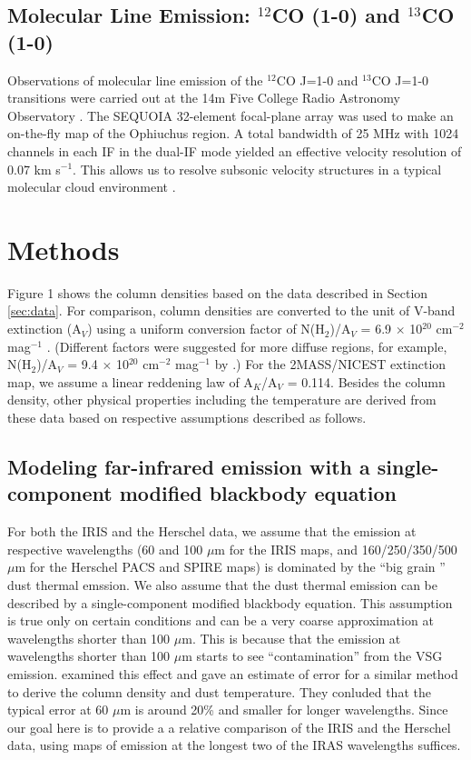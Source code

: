 \documentclass{emulateapj}
\begin{document}
\subsection{Molecular Line Emission: $^{12}$CO (1-0) and $^{13}$CO (1-0)}
Observations of molecular line emission of the $^{12}$CO J=1-0 and $^{13}$CO J=1-0 transitions were carried out at the 14m Five College Radio Astronomy Observatory \citep[FCRAO;]{Ridge_2006}. The SEQUOIA 32-element focal-plane array was used to make an on-the-fly map of the Ophiuchus region. A total bandwidth of 25 MHz with 1024 channels in each IF in the dual-IF mode yielded an effective velocity resolution of 0.07 km s$^{-1}$. This allows us to resolve subsonic velocity structures in a typical molecular cloud environment \citep[with a temperature of 15 K and an average molecular weight of 2.33 m$_H$;]{Carey_1998,Pillai_2006}.

\section{Methods}
\label{sec:methods}
Figure 1 shows the column densities based on the data described in Section \ref{sec:data}. For comparison, column densities are converted to the unit of V-band extinction (A$_V$) using a uniform conversion factor of N(H$_2$)/A$_V$ = 6.9 $\times$ 10$^{20}$ cm$^{-2}$ mag$^{-1}$ \citep{Draine_2003,Evans_2009}. (Different factors were suggested for more diffuse regions, for example, N(H$_2$)/A$_V$ = 9.4 $\times$ 10$^{20}$ cm$^{-2}$ mag$^{-1}$ by \citet{Bohlin_1978}.) For the 2MASS/NICEST extinction map, we assume a linear reddening law of A$_K$/A$_V$ = 0.114. Besides the column density, other physical properties including the temperature are derived from these data based on respective assumptions described as follows.

\subsection{Modeling far-infrared emission with a single-component modified blackbody equation}
For both the IRIS and the Herschel data, we assume that the emission at respective wavelengths (60 and 100 $\mu$m for the IRIS maps, and 160/250/350/500 $\mu$m for the Herschel PACS and SPIRE maps) is dominated by the ``big grain \citep[BG;]{Stepnik_2003}'' dust thermal emssion. We also assume that the dust thermal emission can be described by a single-component modified blackbody equation. This assumption is true only on certain conditions and can be a very coarse approximation at wavelengths shorter than 100 $\mu$m. This is because that the emission at wavelengths shorter than 100 $\mu$m starts to see ``contamination'' from the VSG emission. \citet{Schnee_2007} examined this effect and gave an estimate of error for a similar method to derive the column density and dust temperature. They conluded that the typical error at 60 $\mu$m is around 20\% and smaller for longer wavelengths. Since our goal here is to provide a a relative comparison of the IRIS and the Herschel data, using maps of emission at the longest two of the IRAS wavelengths suffices.
\end{document}
